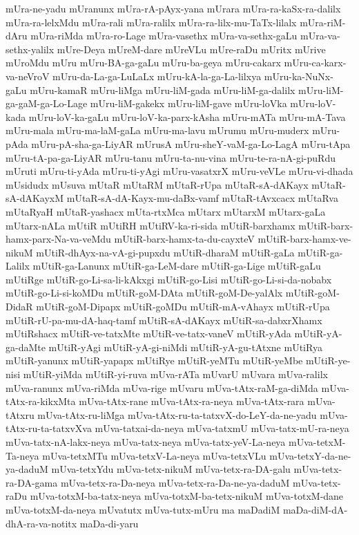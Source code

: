 {mUra-ne-yadu
mUranunx
mUra-rA-pAyx-yana
mUrara
mUra-ra-kaSx-ra-dalilx
mUra-ra-lelxMdu
mUra-rali
mUra-ralilx
mUra-ra-lilx-mu-TaTx-lilalx
mUra-riM-dAru
mUra-riMda
mUra-ro-Lage
mUra-vasethx
mUra-va-sethx-gaLu
mUra-va-sethx-yalilx
mUre-Deya
mUreM-dare
mUreVLu
mUre-raDu
mUritx
mUrive
mUroMdu
mUru
mUru-BA-ga-gaLu
mUru-ba-geya
mUru-cakarx
mUru-ca-karx-va-neVroV
mUru-da-La-ga-LuLaLx
mUru-kA-la-ga-La-lilxya
mUru-ka-NuNx-gaLu
mUru-kamaR
mUru-liMga
mUru-liM-gada
mUru-liM-ga-dalilx
mUru-liM-ga-gaM-ga-Lo-Lage
mUru-liM-gakekx
mUru-liM-gave
mUru-loVka
mUru-loV-kada
mUru-loV-ka-gaLu
mUru-loV-ka-parx-kAsha
mUru-mATa
mUru-mA-Tava
mUru-mala
mUru-ma-laM-gaLa
mUru-ma-lavu
mUrumu
mUru-muderx
mUru-pAda
mUru-pA-sha-ga-LiyAR
mUrusA
mUru-sheY-vaM-ga-Lo-LagA
mUru-tApa
mUru-tA-pa-ga-LiyAR
mUru-tanu
mUru-ta-nu-vina
mUru-te-ra-nA-gi-puRdu
mUruti
mUru-ti-yAda
mUru-ti-yAgi
mUru-vasatxrX
mUru-veVLe
mUru-vi-dhada
mUsidudx
mUsuva
mUtaR
mUtaRM
mUtaR-rUpa
mUtaR-sA-dAKayx
mUtaR-sA-dAKayxM
mUtaR-sA-dA-Kayx-mu-daBx-vamf
mUtaR-tAvxcacx
mUtaRva
mUtaRyaH
mUtaR-yashacx
mUta-rtxMca
mUtarx
mUtarxM
mUtarx-gaLa
mUtarx-nALa
mUtiR
mUtiRH
mUtiRV-ka-ri-sida
mUtiR-barxhamx
mUtiR-barx-hamx-parx-Na-va-veMdu
mUtiR-barx-hamx-ta-du-cayxteV
mUtiR-barx-hamx-ve-nikuM
mUtiR-dhAyx-na-vA-gi-pupxdu
mUtiR-dharaM
mUtiR-gaLa
mUtiR-ga-Lalilx
mUtiR-ga-Lanunx
mUtiR-ga-LeM-dare
mUtiR-ga-Lige
mUtiR-gaLu
mUtiRge
mUtiR-go-Li-sa-li-kAkxgi
mUtiR-go-Lisi
mUtiR-go-Li-si-da-nobabx
mUtiR-go-Li-si-koMDu
mUtiR-goM-DAta
mUtiR-goM-De-yalAlx
mUtiR-goM-DidaR
mUtiR-goM-Dipapx
mUtiR-goMDu
mUtiR-mA-vAhayx
mUtiR-rUpa
mUtiR-rU-pa-mu-dA-haq-tamf
mUtiR-sA-dAKayx
mUtiR-sa-dabxrXhamx
mUtiRshacx
mUtiR-ve-tatxMte
mUtiR-ve-tatx-vaneV
mUtiR-yAda
mUtiR-yA-ga-daMte
mUtiR-yAgi
mUtiR-yA-gi-niMdi
mUtiR-yA-gu-tAtxne
mUtiRya
mUtiR-yanunx
mUtiR-yapapx
mUtiRye
mUtiR-yeMTu
mUtiR-yeMbe
mUtiR-ye-nisi
mUtiR-yiMda
mUtiR-yi-ruva
mUva-rATa
mUvarU
mUvara
mUva-ralilx
mUva-ranunx
mUva-riMda
mUva-rige
mUvaru
mUva-tAtx-raM-ga-diMda
mUva-tAtx-ra-kikxMta
mUva-tAtx-rane
mUva-tAtx-ra-neya
mUva-tAtx-rara
mUva-tAtxru
mUva-tAtx-ru-liMga
mUva-tAtx-ru-ta-tatxvX-do-LeY-da-ne-yadu
mUva-tAtx-ru-ta-tatxvXva
mUva-tatxai-da-neya
mUva-tatxmU
mUva-tatx-mU-ra-neya
mUva-tatx-nA-lakx-neya
mUva-tatx-neya
mUva-tatx-yeV-La-neya
mUva-tetxM-Ta-neya
mUva-tetxMTu
mUva-tetxV-La-neya
mUva-tetxVLu
mUva-tetxY-da-ne-ya-daduM
mUva-tetxYdu
mUva-tetx-nikuM
mUva-tetx-ra-DA-galu
mUva-tetx-ra-DA-gama
mUva-tetx-ra-Da-neya
mUva-tetx-ra-Da-ne-ya-daduM
mUva-tetx-raDu
mUva-totxM-ba-tatx-neya
mUva-totxM-ba-tetx-nikuM
mUva-totxM-dane
mUva-totxM-da-neya
mUvatutx
mUva-tutx-mUru
ma
maDadiM
maDa-diM-dA-dhA-ra-va-notitx
maDa-di-yaru
}
